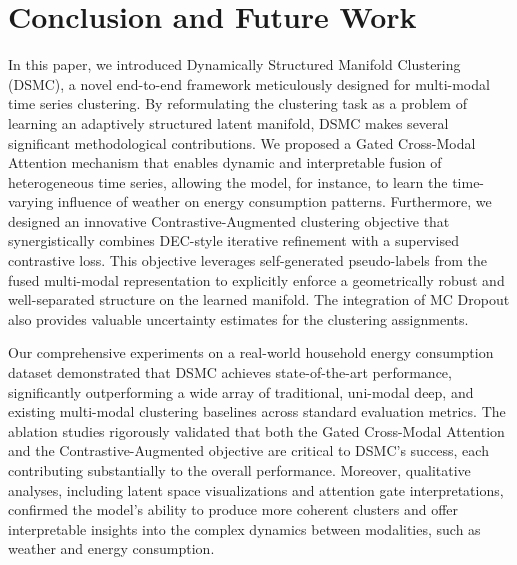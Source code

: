 \documentclass[journal]{IEEEtran}
\begin{document}
\section{Conclusion and Future Work}
In this paper, we introduced Dynamically Structured Manifold Clustering (DSMC), a novel end-to-end framework meticulously designed for multi-modal time series clustering. By reformulating the clustering task as a problem of learning an adaptively structured latent manifold, DSMC makes several significant methodological contributions. We proposed a Gated Cross-Modal Attention mechanism that enables dynamic and interpretable fusion of heterogeneous time series, allowing the model, for instance, to learn the time-varying influence of weather on energy consumption patterns. Furthermore, we designed an innovative Contrastive-Augmented clustering objective that synergistically combines DEC-style iterative refinement with a supervised contrastive loss. This objective leverages self-generated pseudo-labels from the fused multi-modal representation to explicitly enforce a geometrically robust and well-separated structure on the learned manifold. The integration of MC Dropout also provides valuable uncertainty estimates for the clustering assignments.

Our comprehensive experiments on a real-world household energy consumption dataset demonstrated that DSMC achieves state-of-the-art performance, significantly outperforming a wide array of traditional, uni-modal deep, and existing multi-modal clustering baselines across standard evaluation metrics. The ablation studies rigorously validated that both the Gated Cross-Modal Attention and the Contrastive-Augmented objective are critical to DSMC's success, each contributing substantially to the overall performance. Moreover, qualitative analyses, including latent space visualizations and attention gate interpretations, confirmed the model's ability to produce more coherent clusters and offer interpretable insights into the complex dynamics between modalities, such as weather and energy consumption.
\end{document}

